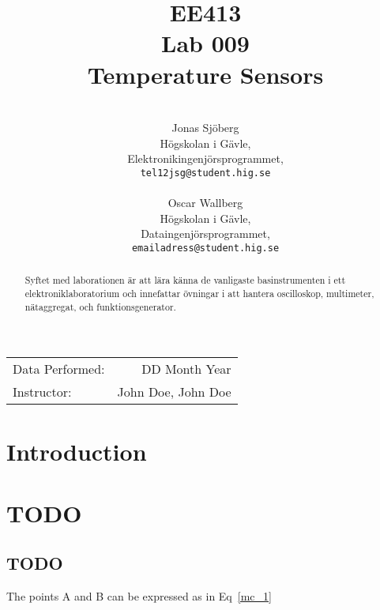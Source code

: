 \documentclass[draft,11pt,a4paper]{article}
\title{EE413 \\ Lab 009 \\ Temperature Sensors}
\author{\\
  Jonas Sjöberg\\
  Högskolan i Gävle,\\
  Elektronikingenjörsprogrammet,\\
  \texttt{tel12jsg@student.hig.se}\\
  \\
  Oscar Wallberg\\
  Högskolan i Gävle,\\
  Dataingenjörsprogrammet,\\
  \texttt{emailadress@student.hig.se}\\}
\date{}
\begin{document}
\maketitle

\begin{center}
\begin{tabular}{l r}
    Data Performed: & DD Month Year \\
    Instructor: & John Doe, John Doe
\end{tabular}
\end{center}

\begin{abstract}
Syftet med laborationen är att lära känna de vanligaste basinstrumenten i ett elektroniklaboratorium och innefattar övningar i att hantera oscilloskop, multimeter, nätaggregat, och funktionsgenerator.
\end{abstract}

\newpage

{
\setcounter{tocdepth}{3}
\tableofcontents
}

\newpage

\section{Introduction}\label{setup}


\section{TODO}\label{TODO}

\subsection{TODO}\label{TODO}
The points A and B can be expressed as in Eq~\ref{mc_1}
\end{document}

